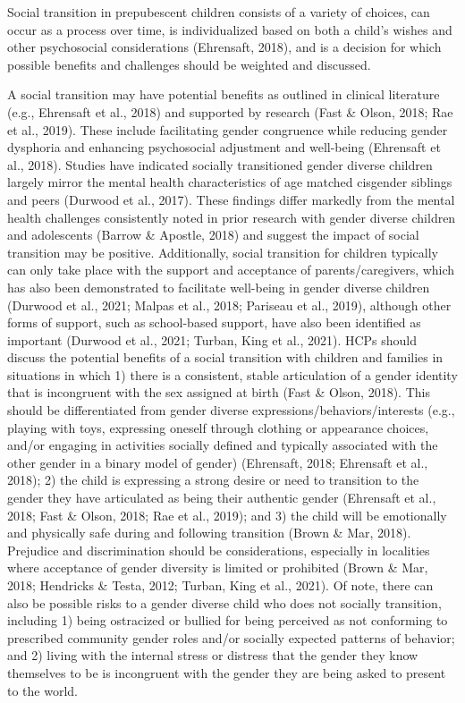 \documentclass[
]{book}
\begin{document}
Social transition in prepubescent children consists of a variety of choices, can occur as a process over time, is individualized based on both
a child's wishes and other psychosocial considerations (Ehrensaft, 2018), and is a decision for
which possible benefits and challenges should be
weighted and discussed.

A social transition may have potential benefits
as outlined in clinical literature (e.g., Ehrensaft
et al., 2018) and supported by research (Fast \&
Olson, 2018; Rae et al., 2019). These include
facilitating gender congruence while reducing
gender dysphoria and enhancing psychosocial
adjustment and well-being (Ehrensaft et al., 2018).
Studies have indicated socially transitioned gender diverse children largely mirror the mental
health characteristics of age matched cisgender
siblings and peers (Durwood et al., 2017). These
findings differ markedly from the mental health
challenges consistently noted in prior research
with gender diverse children and adolescents
(Barrow \& Apostle, 2018) and suggest the impact
of social transition may be positive. Additionally,
social transition for children typically can only
take place with the support and acceptance of
parents/caregivers, which has also been demonstrated to facilitate well-being in gender diverse
children (Durwood et al., 2021; Malpas et al.,
2018; Pariseau et al., 2019), although other forms
of support, such as school-based support, have
also been identified as important (Durwood
et al., 2021; Turban, King et al., 2021). HCPs
should discuss the potential benefits of a social
transition with children and families in situations
in which 1) there is a consistent, stable articulation of a gender identity that is incongruent with
the sex assigned at birth (Fast \& Olson, 2018).
This should be differentiated from gender diverse
expressions/behaviors/interests (e.g., playing with
toys, expressing oneself through clothing or
appearance choices, and/or engaging in activities
socially defined and typically associated with the
other gender in a binary model of gender)
(Ehrensaft, 2018; Ehrensaft et al., 2018); 2) the
child is expressing a strong desire or need to
transition to the gender they have articulated as
being their authentic gender (Ehrensaft et al.,
2018; Fast \& Olson, 2018; Rae et al., 2019); and
3) the child will be emotionally and physically
safe during and following transition (Brown \&
Mar, 2018). Prejudice and discrimination should
be considerations, especially in localities where
acceptance of gender diversity is limited or prohibited (Brown \& Mar, 2018; Hendricks \& Testa,
2012; Turban, King et al., 2021). Of note, there
can also be possible risks to a gender diverse
child who does not socially transition, including
1) being ostracized or bullied for being perceived
as not conforming to prescribed community
gender roles and/or socially expected patterns of
behavior; and 2) living with the internal stress
or distress that the gender they know themselves
to be is incongruent with the gender they are
being asked to present to the world.
\end{document}

